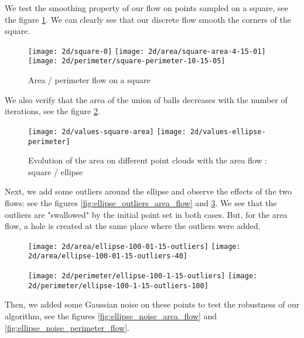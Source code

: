 We test the smoothing property of our flow on points sampled on a square, see
the figure \ref{fig:area_perimeter_flow_square}. We can clearly see that our
discrete flow smooth the corners of the square.

\begin{figure}[h]
    \centering
    \texttt{[image: 2d/square-0]}
    \texttt{[image: 2d/area/square-area-4-15-01]}
    \texttt{[image: 2d/perimeter/square-perimeter-10-15-05]}
    \caption{Area / perimeter flow on a square}
    \label{fig:area_perimeter_flow_square}
\end{figure}

We also verify that the area of the union of balls decreases with the number of
iterations, see the figure \ref{fig:area_time_decrease}.

\begin{figure}[h]
    \centering
    \texttt{[image: 2d/values-square-area]}
    \texttt{[image: 2d/values-ellipse-perimeter]}
    \caption{Evolution of the area on different point clouds with the area
        flow : square / ellipse}
    \label{fig:area_time_decrease}
\end{figure}

Next, we add some outliers around the ellipse and observe the effects of the two
flows: see the figures \ref{fig:ellipse_outliers_area_flow} and
\ref{fig:ellipse_outliers_perimeter_flow}. We see that the outliers are
"swallowed" by the initial point set in both cases. But, for the area flow, a
hole is created at the same place where the outliers were added.

\begin{figure}[h]
    \centering

    \texttt{[image: 2d/area/ellipse-100-01-15-outliers]}
    \texttt{[image: 2d/area/ellipse-100-01-15-outliers-40]}
    \label{fig:ellipse_outliers_area_flow}

    \texttt{[image: 2d/perimeter/ellipse-100-1-15-outliers]}
    \texttt{[image: 2d/perimeter/ellipse-100-1-15-outliers-100]}
    \label{fig:ellipse_outliers_perimeter_flow}
\end{figure}

Then, we added some Gaussian noise on these points to test the robustness of our
algorithm, see the figures \ref{fig:ellipse_noise_area_flow} and
\ref{fig:ellipse_noise_perimeter_flow}.

